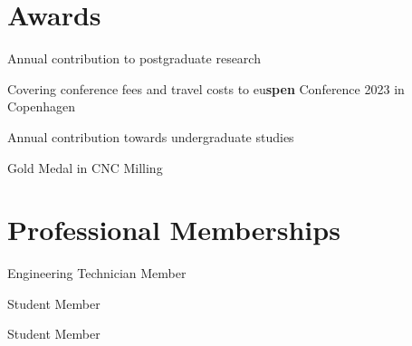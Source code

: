 \documentclass{cv}
\begin{document}
\section{Awards}

Annual contribution to postgraduate research

Covering conference fees and travel costs to eu\textbf{spen} Conference 2023 in Copenhagen 


Annual contribution towards undergraduate studies

 Gold Medal in CNC Milling 

\section{Professional Memberships}

Engineering Technician Member 

Student Member 

Student Member 
\end{document}
